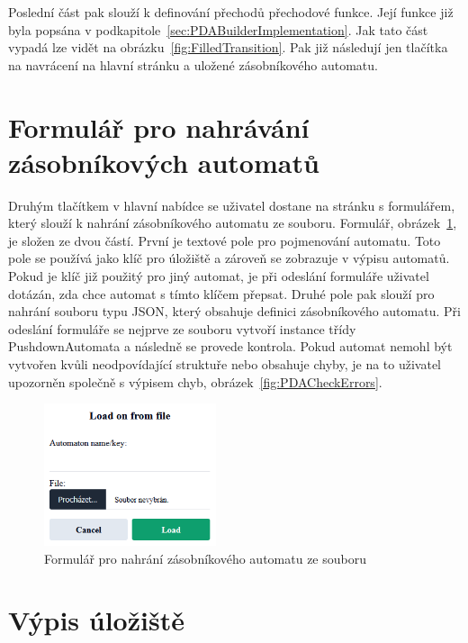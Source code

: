 Poslední část pak slouží k definování přechodů přechodové funkce. Její funkce již byla popsána v podkapitole~\ref{sec:PDABuilderImplementation}. Jak tato část vypadá lze vidět na obrázku~\ref{fig:FilledTransition}. Pak již následují jen tlačítka na navrácení na hlavní stránku a uložené zásobníkového automatu.

\section{Formulář pro nahrávání zásobníkových automatů}\label{sec:UploadForm}

Druhým tlačítkem v hlavní nabídce se uživatel dostane na stránku s formulářem, který slouží k nahrání zásobníkového automatu ze souboru. Formulář, obrázek~\ref{fig:UploadForm}, je složen ze dvou částí. První je textové pole pro pojmenování automatu. Toto pole se používá jako klíč pro úložiště a zároveň se zobrazuje v výpisu automatů. Pokud je klíč již použitý pro jiný automat, je při odeslání formuláře uživatel dotázán, zda chce automat s tímto klíčem přepsat. Druhé pole pak slouží pro nahrání souboru typu JSON, který obsahuje definici zásobníkového automatu. Při odeslání formuláře se nejprve ze souboru vytvoří instance třídy PushdownAutomata a následně se provede kontrola. Pokud automat nemohl být vytvořen kvůli neodpovídající struktuře nebo obsahuje chyby, je na to uživatel upozorněn společně s výpisem chyb, obrázek~\ref{fig:PDACheckErrors}.

\begin{figure}[h]
    \centering
    \includegraphics[width=0.45\textwidth]{Figures/PrntScrn_UI_Upload.png}
    \caption{Formulář pro nahrání zásobníkového automatu ze souboru}\label{fig:UploadForm}
\end{figure}

\section{Výpis úložiště}\label{sec:StoragePage}

